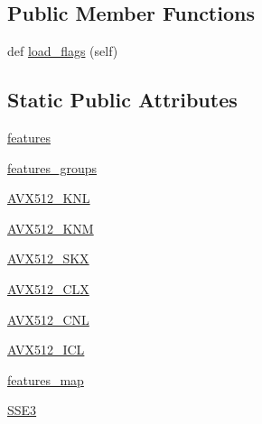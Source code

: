\subsection*{Public Member Functions}
\begin{DoxyCompactItemize}
\item 
def \hyperlink{classnumpy_1_1core_1_1tests_1_1test__cpu__features_1_1Test__X86__Features_a88df8c18e20942f2d08c7d1078e8af19}{load\+\_\+flags} (self)
\end{DoxyCompactItemize}
\subsection*{Static Public Attributes}
\begin{DoxyCompactItemize}
\item 
\hyperlink{classnumpy_1_1core_1_1tests_1_1test__cpu__features_1_1Test__X86__Features_a6b2a034ca049edccd70eee3db973c33a}{features}
\item 
\hyperlink{classnumpy_1_1core_1_1tests_1_1test__cpu__features_1_1Test__X86__Features_a6355f4eb0d5318ef816ea2af2a869514}{features\+\_\+groups}
\item 
\hyperlink{classnumpy_1_1core_1_1tests_1_1test__cpu__features_1_1Test__X86__Features_ae95256bcfb58b24cfd95fd6016caa344}{A\+V\+X512\+\_\+\+K\+NL}
\item 
\hyperlink{classnumpy_1_1core_1_1tests_1_1test__cpu__features_1_1Test__X86__Features_a970a5fbb1f9dc987259e0ce9f476a04f}{A\+V\+X512\+\_\+\+K\+NM}
\item 
\hyperlink{classnumpy_1_1core_1_1tests_1_1test__cpu__features_1_1Test__X86__Features_a28f2100ee2d00b08fa65833ca823655c}{A\+V\+X512\+\_\+\+S\+KX}
\item 
\hyperlink{classnumpy_1_1core_1_1tests_1_1test__cpu__features_1_1Test__X86__Features_a0bcd125a4ea33ef305a07914b66be144}{A\+V\+X512\+\_\+\+C\+LX}
\item 
\hyperlink{classnumpy_1_1core_1_1tests_1_1test__cpu__features_1_1Test__X86__Features_a659287a84b89e4a2a6c4c6fd886968d7}{A\+V\+X512\+\_\+\+C\+NL}
\item 
\hyperlink{classnumpy_1_1core_1_1tests_1_1test__cpu__features_1_1Test__X86__Features_a6cb37b3d1c7e390f34c4632777ff03bb}{A\+V\+X512\+\_\+\+I\+CL}
\item 
\hyperlink{classnumpy_1_1core_1_1tests_1_1test__cpu__features_1_1Test__X86__Features_a60c42104a686e26e57bcf38b326e6b10}{features\+\_\+map}
\item 
\hyperlink{classnumpy_1_1core_1_1tests_1_1test__cpu__features_1_1Test__X86__Features_a0891b2f87be0b29fece0ad2e250cd62a}{S\+S\+E3}

\end{DoxyCompactItemize}
